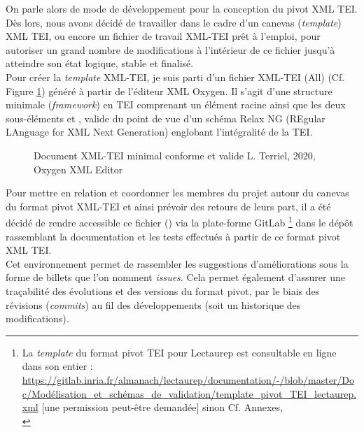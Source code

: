 On parle alors de mode de développement  pour la conception du pivot XML TEI. Dès lors, nous avons décidé de travailler dans le cadre d'un canevas (\textit{template}) XML TEI, ou encore un fichier de travail XML-TEI prêt à l'emploi, pour autoriser un grand nombre de modifications à l'intérieur de ce fichier jusqu'à atteindre son état logique, stable et finalisé.\\

Pour créer la \textit{template} XML-TEI, je suis parti d'un fichier XML-TEI (All) (Cf. Figure \ref{fig:document_minimal_tei}) généré à partir de l'éditeur XML Oxygen. Il s'agit d'une structure minimale (\textit{framework}) en TEI comprenant un élément racine  ainsi que les deux sous-éléments  et , valide du point de vue d'un schéma Relax NG (REgular LAnguage for XML Next Generation) englobant l'intégralité de la TEI.
   
\begin{figure}[h]
    \centering
    \centerline{}
    \caption{Document XML-TEI minimal conforme et valide  \textcopyright L. Terriel, 2020, Oxygen XML Editor}
    \label{fig:document_minimal_tei}
\end{figure}

\newpage
Pour mettre en relation et coordonner les membres du projet autour du canevas du format pivot XML-TEI et ainsi prévoir des retours de leurs part, il a été décidé de rendre accessible ce fichier () via la plate-forme GitLab \footnote{La \textit{template} du format pivot TEI pour Lectaurep est consultable en ligne dans son entier : \url{https://gitlab.inria.fr/almanach/lectaurep/documentation/-/blob/master/Doc/Modélisation_et_schémas_de_validation/template_pivot_TEI_lectaurep.xml} [une permission peut-être demandée] sinon Cf. Annexes,\\ } dans le dépôt rassemblant la documentation et les tests effectués à partir de ce format pivot XML TEI.\\

Cet environnement permet de rassembler les suggestions d'améliorations sous la forme de billets que l'on nomment \textit{issues}. Cela permet également d'assurer une traçabilité des évolutions et des versions du format pivot, par le biais des révisions (\textit{commits}) au fil des développements (soit un historique des modifications).\\

